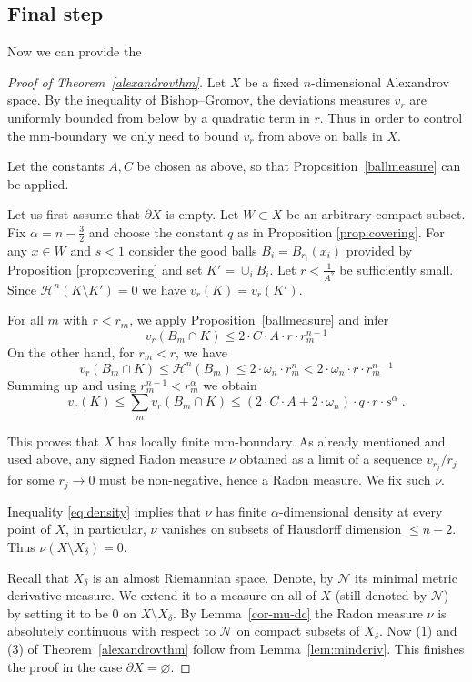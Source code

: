 \documentclass[12pt,leqno]{amsart}
\numberwithin{equation}{section}
\theoremstyle{definition}
\theoremstyle{remark}
\newcommand{\tref}[1]{Theorem~\ref{#1}}
\newcommand{\pref}[1]{Proposition~\ref{#1}}
\newcommand{\lref}[1]{Lemma~\ref{#1}}
\def\emptyset{\varnothing}
\begin{document}
\subsection{Final step}
Now we can provide the
\begin{proof}[Proof of Theorem~\ref{alexandrovthm}]
Let $X$ be a fixed $n$-dimensional Alexandrov space.   By the inequality of Bishop--Gromov,  the deviations measures $v_r$ are uniformly bounded from below
by a quadratic term in $r$. Thus  in order to control the mm-boundary  we only need to bound $v_r$ from above on balls in $X$.

 Let the constants $A,C$ be chosen as above, so that \pref{ballmeasure} can be applied.

Let us first assume that $\partial X$  is empty.
 Let $W\subset X$ be an arbitrary  compact subset. Fix $\alpha =n-\frac 3 2$ and choose the constant $q$ as in Proposition \ref{prop:covering}.
For any $x\in W$ and $s<1$ consider the  good  balls $B_i=B_{r_i} (x_i)$ provided by Proposition \ref{prop:covering} and set $K'=\cup _i B_i$. Let $r<\frac 1 {A^2}$ be sufficiently small.  Since $\mathcal H^n (K\setminus K')=0$
we have $ v_r (K)=v_r (K')$.





For all $m$ with $r<r_m$, we apply \pref{ballmeasure} and infer
$$v_r(B_m \cap K)\le 2\cdot  C\cdot A \cdot r\cdot r_m^{n-1} $$
On the other hand, for $r_m<r$, we have
$$v_r (B_m\cap K) \leq \mathcal H^n  (B_m) \leq 2 \cdot \omega _n  \cdot r_m ^n < 2\cdot \omega_n \cdot r \cdot r_m ^{n-1} $$
Summing up  and using $r_m^{n-1} < r_m ^{\alpha}$ we obtain
\begin{equation} \label{eq:density}
v_r (K) \leq \sum_m v_r (B_m \cap K) \leq (2\cdot C\cdot A+2\cdot \omega _n) \cdot q\cdot  r \cdot s^{\alpha} \; .
\end{equation}

This proves that $X$ has locally finite mm-boundary.  As already mentioned and used above, any  signed Radon measure $\nu$ obtained as a limit of a sequence $v_{r_j} /r_j$ for some $r_j\to 0$ must be non-negative, hence a Radon measure.    We fix such $\nu$.

Inequality \eqref{eq:density} implies that $\nu$ has finite $\alpha$-dimensional density at every point of $X$, in particular, $\nu$  vanishes on subsets of Hausdorff dimension $\leq n-2$.
  Thus $\nu (X \setminus X_{\delta } )=0$.

Recall that $X_{\delta}$ is an almost Riemannian space. Denote, by $\mathcal N $ its minimal metric derivative measure. We extend it to a measure on all of $X$ (still denoted by $\mathcal N $) by setting it to be $0$ on $X\setminus X_{\delta}$.
By \lref{cor-mu-dc} the Radon measure  $\nu$  is absolutely continuous with respect to  $\mathcal N $ on compact subsets of $X_{\delta}$.
  Now (1) and (3) of \tref{alexandrovthm} follow from \lref{lem:minderiv}.
 This finishes the proof in the case $\partial X=\emptyset$.




\end{proof}
\end{document}
